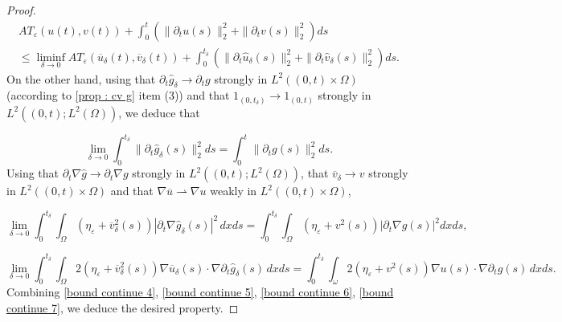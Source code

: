 \documentclass[reqno,12pt,twoside]{amsart}
\numberwithin{equation}{section} \numberwithin{theorem}{section}
\numberwithin{proposition}{section} \numberwithin{lemma}{section}
\numberwithin{corollary}{section}
\numberwithin{definition}{section} \numberwithin{remark}{section}
\begin{document}
\begin{proof}
\begin{multline}\label{bound continue 4}
AT_\varepsilon (u(t), v(t)) + \int_0^t \left(\|\partial_t u(s)\|_{2}^2 +\|\partial_t v(s)\|_{2}^2 \right)ds\\
\leqslant \liminf\limits_{\delta \rightarrow 0} AT_\varepsilon (\overline{u}_\delta(t), \overline{v}_\delta(t)) + \int_0^{t_\delta} \left(\|\partial_t \hat{u}_\delta(s) \|_{2}^2 + \|\partial_t \hat{v}_\delta (s) \|_{2}^2\right)ds.
\end{multline}
On the other hand, using that $\partial_t\hat{g}_\delta\rightarrow \partial_t g$ strongly in $L^2((0,t)\times \Omega)$ (according to \autoref{prop : cv g} item (3)) and that $1_{(0,t_\delta)} \rightarrow 1_{(0,t)}$ strongly in $L^2((0,t); L^2(\Omega))$, we deduce that 

\begin{equation}\label{bound continue 5}
\lim\limits_{\delta \rightarrow 0} \int_0^{t_\delta} \|\partial_t \hat{g}_\delta(s)\|_2^2 ds = \int_0^t \|\partial_t g(s)\|_2^2 ds. 
\end{equation}
Using that $\partial_t\nabla \hat{g}\rightarrow \partial_t \nabla g$ strongly in $L^2((0,t);L^2(\Omega))$, that $\overline{v}_\delta \rightarrow v$ strongly in $L^2((0,t)\times \Omega)$ and that $\nabla \overline{u} \rightharpoonup \nabla u$ weakly in $L^2((0,t)\times \Omega)$, %

\begin{equation}\label{bound continue 6}
\lim\limits_{\delta \rightarrow 0} \int_0^{t_\delta} \int_\Omega(\eta_\varepsilon +\overline{v}_\delta^2(s)) |\partial_t \nabla \hat{g}_\delta(s)|^2 \, dx ds = \int_0^{t_\delta}\int_\Omega (\eta_\varepsilon + v^2(s))|\partial_t \nabla g(s)|^2 dx ds,
\end{equation}

\begin{equation}\label{bound continue 7}
\lim\limits_{\delta \rightarrow 0} \int_0^{t_\delta}\int_\Omega 2(\eta_\varepsilon +\overline{v}_\delta^2(s)) \nabla \overline{u}_\delta(s)\cdot \nabla \partial_t \hat{g}_\delta(s) \, dxds= \int_0^{t_\delta} \int_\omega 2(\eta_\varepsilon + v^2(s))\nabla u(s) \cdot \nabla \partial_t g(s) \, dxds. 
\end{equation}
Combining \eqref{bound continue 4}, \eqref{bound continue 5}, \eqref{bound continue 6}, \eqref{bound continue 7}, we deduce the desired property. 
\end{proof}
\end{document}
